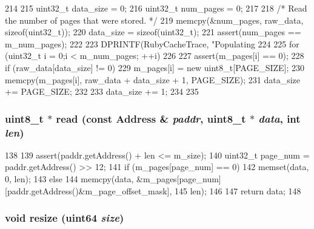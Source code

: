 \begin{DoxyCode}
214 {
215     uint32_t data_size = 0;
216     uint32_t num_pages = 0;
217 
218     /* Read the number of pages that were stored. */
219     memcpy(&num_pages, raw_data, sizeof(uint32_t));
220     data_size = sizeof(uint32_t);
221     assert(num_pages == m_num_pages);
222 
223     DPRINTF(RubyCacheTrace, "Populating %
224 
225     for (uint32_t i = 0;i < m_num_pages; ++i)
226     {
227         assert(m_pages[i] == 0);
228         if (raw_data[data_size] != 0) {
229             m_pages[i] = new uint8_t[PAGE_SIZE];
230             memcpy(m_pages[i], raw_data + data_size + 1, PAGE_SIZE);
231             data_size += PAGE_SIZE;
232         }
233         data_size += 1;
234     }
235 }
\end{DoxyCode}
\hypertarget{classMemoryVector_a7752d5bff6be1de2b0e44953b0de5fea}{
\subsubsection[{read}]{\setlength{\rightskip}{0pt plus 5cm}uint8\_\-t $\ast$ read (const {\bf Address} \& {\em paddr}, \/  uint8\_\-t $\ast$ {\em data}, \/  int {\em len})}}
\label{classMemoryVector_a7752d5bff6be1de2b0e44953b0de5fea}



\begin{DoxyCode}
138 {
139     assert(paddr.getAddress() + len <= m_size);
140     uint32_t page_num = paddr.getAddress() >> 12;
141     if (m_pages[page_num] == 0) {
142         memset(data, 0, len);
143     } else {
144         memcpy(data, &m_pages[page_num][paddr.getAddress()&m_page_offset_mask],
145                len);
146     }
147     return data;
148 }
\end{DoxyCode}
\hypertarget{classMemoryVector_a6da191301b562078e345bd2b6399a9a1}{
\subsubsection[{resize}]{\setlength{\rightskip}{0pt plus 5cm}void resize ({\bf uint64} {\em size})}}
\label{classMemoryVector_a6da191301b562078e345bd2b6399a9a1}



